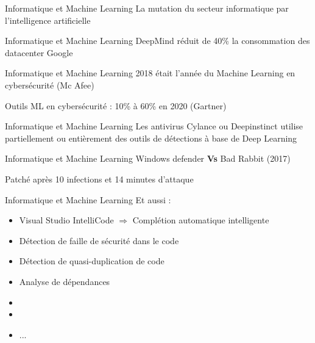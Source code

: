 \begin{frame}{Informatique et Machine Learning}
  La mutation du secteur informatique par l'intelligence artificielle
\end{frame}

\begin{frame}{Informatique et Machine Learning}
  DeepMind réduit de 40\% la consommation des datacenter Google
\end{frame}

\begin{frame}{Informatique et Machine Learning}
  2018 était l'année du Machine Learning en cybersécurité (Mc Afee)

  Outils ML en cybersécurité : 10\% à 60\% en 2020 (Gartner)
\end{frame}

\begin{frame}{Informatique et Machine Learning}
  Les antivirus Cylance ou Deepinstinct utilise partiellement ou entièrement des outils de détections à base de Deep Learning

  \begin{minipage}[c]{0.49\linewidth}
  \end{minipage}\hfill
  \begin{minipage}[c]{0.49\linewidth}
  \end{minipage}\hfill
\end{frame}

\begin{frame}{Informatique et Machine Learning}
  Windows defender \textbf{Vs} Bad Rabbit (2017)

  Patché après 10 infections et 14 minutes d'attaque

  \begin{minipage}[c]{0.49\linewidth}
  \end{minipage}\hfill
  \begin{minipage}[c]{0.49\linewidth}
  \end{minipage}\hfill
\end{frame}

\begin{frame}{Informatique et Machine Learning}
  Et aussi :
  \begin{itemize}
  \item Visual Studio IntelliCode $\Rightarrow$ Complétion automatique intelligente
  \item Détection de faille de sécurité dans le code
  \item Détection de quasi-duplication de code
  \item Analyse de dépendances
  \item {}
  \item {}
  \item ...
  \end{itemize}
\end{frame}
